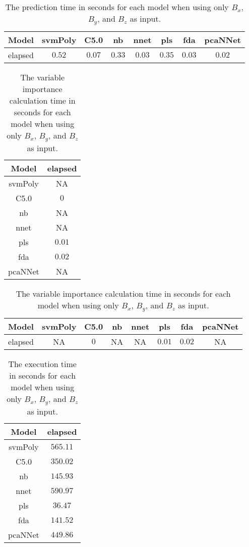 \begin{table}[!ht]
	\centering
	\begin{tabular}{|c|c|c|c|c|c|c|c|}
		\hline
		Model & svmPoly & C5.0 & nb & nnet & pls & fda & pcaNNet \\ \hline
		elapsed & $0.52$ & $0.07$ & $0.33$ & $0.03$ & $0.35$ & $0.03$ & $0.02$ \\ \hline
	\end{tabular}
	\caption{The prediction time in seconds for each model when using only $B_{x}$, $B_{y}$, and $B_{z}$ as input.}
	\label{tab:time:reverse:coord:predict}
\end{table}

\begin{table}[!ht]
	\centering
	\begin{tabular}{|c|c|}
		\hline
		Model & elapsed \\ \hline
		svmPoly & NA \\ \hline
		C5.0 & $0$ \\ \hline
		nb & NA \\ \hline
		nnet & NA \\ \hline
		pls & $0.01$ \\ \hline
		fda & $0.02$ \\ \hline
		pcaNNet & NA \\ \hline
	\end{tabular}
	\caption{The variable importance calculation time in seconds for each model when using only $B_{x}$, $B_{y}$, and $B_{z}$ as input.}
	\label{tab:time:coord:importance}
\end{table}

\begin{table}[!ht]
	\centering
	\begin{tabular}{|c|c|c|c|c|c|c|c|}
		\hline
		Model & svmPoly & C5.0 & nb & nnet & pls & fda & pcaNNet \\ \hline
		elapsed & NA & $0$ & NA & NA & $0.01$ & $0.02$ & NA \\ \hline
	\end{tabular}
	\caption{The variable importance calculation time in seconds for each model when using only $B_{x}$, $B_{y}$, and $B_{z}$ as input.}
	\label{tab:time:reverse:coord:importance}
\end{table}

\begin{table}[!ht]
	\centering
	\begin{tabular}{|c|c|}
		\hline
		Model & elapsed \\ \hline
		svmPoly & $565.11$ \\ \hline
		C5.0 & $350.02$ \\ \hline
		nb & $145.93$ \\ \hline
		nnet & $590.97$ \\ \hline
		pls & $36.47$ \\ \hline
		fda & $141.52$ \\ \hline
		pcaNNet & $449.86$ \\ \hline
	\end{tabular}
	\caption{The execution time in seconds for each model when using only $B_{x}$, $B_{y}$, and $B_{z}$ as input.}
	\label{tab:time:coord:total}
\end{table}

